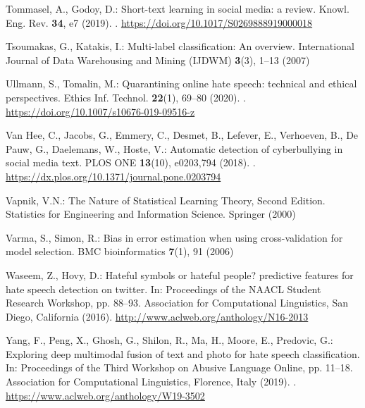 \documentclass{article}
\begin{document}
\begin{thebibliography}{10}
Tommasel, A., Godoy, D.: Short-text learning in social media: a review.
\newblock Knowl. Eng. Rev. \textbf{34}, e7 (2019).
\newblock {}.
\newblock \urlprefix\url{https://doi.org/10.1017/S0269888919000018}

Tsoumakas, G., Katakis, I.: Multi-label classification: An overview.
\newblock International Journal of Data Warehousing and Mining (IJDWM)
  \textbf{3}(3), 1--13 (2007)

Ullmann, S., Tomalin, M.: Quarantining online hate speech: technical and
  ethical perspectives.
\newblock Ethics Inf. Technol. \textbf{22}(1), 69--80 (2020).
\newblock {}.
\newblock \urlprefix\url{https://doi.org/10.1007/s10676-019-09516-z}

{Van Hee}, C., Jacobs, G., Emmery, C., Desmet, B., Lefever, E., Verhoeven, B.,
  {De Pauw}, G., Daelemans, W., Hoste, V.: {Automatic detection of
  cyberbullying in social media text}.
\newblock PLOS ONE \textbf{13}(10), e0203,794 (2018).
\newblock {}.
\newblock \urlprefix\url{https://dx.plos.org/10.1371/journal.pone.0203794}

Vapnik, V.N.: The Nature of Statistical Learning Theory, Second Edition.
\newblock Statistics for Engineering and Information Science. Springer (2000)

Varma, S., Simon, R.: Bias in error estimation when using cross-validation for
  model selection.
\newblock BMC bioinformatics \textbf{7}(1), 91 (2006)

Waseem, Z., Hovy, D.: Hateful symbols or hateful people? predictive features
  for hate speech detection on twitter.
\newblock In: Proceedings of the NAACL Student Research Workshop, pp. 88--93.
  Association for Computational Linguistics, San Diego, California (2016).
\newblock \urlprefix\url{http://www.aclweb.org/anthology/N16-2013}

Yang, F., Peng, X., Ghosh, G., Shilon, R., Ma, H., Moore, E., Predovic, G.:
  Exploring deep multimodal fusion of text and photo for hate speech
  classification.
\newblock In: Proceedings of the Third Workshop on Abusive Language Online, pp.
  11--18. Association for Computational Linguistics, Florence, Italy (2019).
\newblock {}.
\newblock \urlprefix\url{https://www.aclweb.org/anthology/W19-3502}


\end{thebibliography}
\end{document}
